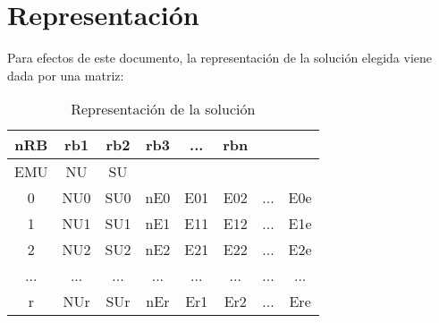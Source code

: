 \documentclass[letter, 10pt]{article}
\begin{document}

\section{Representaci\'on}

Para efectos de este documento, la representaci\'on de la soluci\'on elegida viene dada por una matriz:

\begin{table}[H]
    \begin{center}
    \begin{tabular}{|cccccccc|}
    \hline
    nRB                       & rb1                      & rb2                      & rb3                      & ...                      & rbn                      &                          &     \\ \hline
    EMU                       & NU                       & SU                       &                          &                          &                          &                          &     \\ \hline
    \multicolumn{1}{|c|}{0}   & \multicolumn{1}{c|}{NU0} & \multicolumn{1}{c|}{SU0} & \multicolumn{1}{c|}{nE0} & \multicolumn{1}{c|}{E01} & \multicolumn{1}{c|}{E02} & \multicolumn{1}{c|}{...}                      & E0e \\ \hline
    \multicolumn{1}{|c|}{1}   & \multicolumn{1}{c|}{NU1} & \multicolumn{1}{c|}{SU1} & \multicolumn{1}{c|}{nE1} & \multicolumn{1}{c|}{E11} & \multicolumn{1}{c|}{E12} & \multicolumn{1}{c|}{...} & E1e \\ \hline
    \multicolumn{1}{|c|}{2}   & \multicolumn{1}{c|}{NU2} & \multicolumn{1}{c|}{SU2} & \multicolumn{1}{c|}{nE2} & \multicolumn{1}{c|}{E21} & \multicolumn{1}{c|}{E22} & \multicolumn{1}{c|}{...} & E2e \\ \hline
    \multicolumn{1}{|c|}{...} & \multicolumn{1}{c|}{...} & \multicolumn{1}{c|}{...} & \multicolumn{1}{c|}{...} & \multicolumn{1}{c|}{...} & \multicolumn{1}{c|}{...} & \multicolumn{1}{c|}{...} & ... \\ \hline
    \multicolumn{1}{|c|}{r}   & \multicolumn{1}{c|}{NUr} & \multicolumn{1}{c|}{SUr} & \multicolumn{1}{c|}{nEr} & \multicolumn{1}{c|}{Er1} & \multicolumn{1}{c|}{Er2} & \multicolumn{1}{c|}{...} & Ere \\ \hline
    \end{tabular}
    \caption{Representaci\'on de la soluci\'on}
    \end{center}
\end{table}
\end{document}
